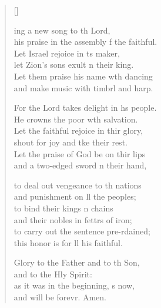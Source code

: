 \settowidth{\versewidth}{his praise in the assembly of the faithful.}
\begin{verse}[\versewidth]
  \begin{patverse}
    ing a new song to th Lord,\Med\\
his praise in the assembly f the faithful.\\
Let Israel rejoice in \pointup{\i}ts maker,\Med\\
let Zion’s sons exult n their king.\\
Let them praise his name w\pointup{\i}th dancing\Med\\
and make music with timbrl and harp.

For the Lord takes delight in h\pointup{\i}s people.\Med\\
He crowns the poor wth salvation.\\
Let the faithful rejoice in thir glory,\Med\\
shout for joy and tke their rest.\\
Let the praise of God be on thir lips\Med\\
and a two-edged sword n their hand,

to deal out vengeance to th nations\Med\\
and punishment on ll the peoples;\\
to bind their kings \pointup{\i}n chains\Med\\
and their nobles in fettrs of iron;\\
to carry out the sentence pre-rdained;\Med\\
this honor is for ll his faithful.

Glory to the Father and to th Son,\Med\\
and to the Hly Spirit:\\
as it was in the beginning, \pointup{\i}s now,\Med\\
and will be forevr. Amen.
  \end{patverse}
\end{verse}
